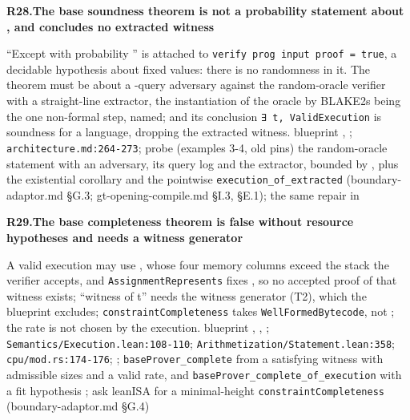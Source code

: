 \par\medskip\noindent\textbf{R28.}\enspace\textbf{The base soundness theorem is not a probability statement about , and concludes no extracted witness}\par\nopagebreak
{} ``Except with probability '' is attached to \texttt{verify prog input proof =\allowbreak{} true}, a decidable hypothesis about fixed values: there is no randomness in it. The theorem must be about a -query adversary against the random-oracle verifier with a straight-line extractor, the instantiation of the oracle by BLAKE2s being the one non-formal step, named; and its conclusion \texttt{∃ t,\allowbreak{} Valid\allowbreak{}Execution} is soundness for a language, dropping the extracted witness.
 blueprint , ; \texttt{architecture.\allowbreak{}md:\allowbreak{}264-\allowbreak{}273}; probe  (examples 3-4, old pins)
 the random-oracle statement with an adversary, its query log and the extractor, bounded by , plus the existential corollary and the pointwise \texttt{execution\_\allowbreak{}of\_\allowbreak{}extracted} (boundary-adaptor.md §G.3; gt-opening-compile.md §I.3, §E.1); the same repair in 

\par\medskip\noindent\textbf{R29.}\enspace\textbf{The base completeness theorem is false without resource hypotheses and needs a witness generator}\par\nopagebreak
{} A valid execution may use , whose four memory columns exceed the  stack the verifier accepts, and \texttt{Assignment\allowbreak{}Represents} fixes , so no accepted proof of that witness exists; ``witness of t'' needs the witness generator (T2), which the blueprint excludes; \texttt{constraint\allowbreak{}Completeness} takes \texttt{Well\allowbreak{}Formed\allowbreak{}Bytecode}, not ; the rate is not chosen by the execution.
 blueprint , , ; \texttt{Semantics/\allowbreak{}Execution.\allowbreak{}lean:\allowbreak{}108-\allowbreak{}110}; \texttt{Arithmetization/\allowbreak{}Statement.\allowbreak{}lean:\allowbreak{}358}; \texttt{cpu/\allowbreak{}mod.\allowbreak{}rs:\allowbreak{}174-\allowbreak{}176}; ; 
 \texttt{base\allowbreak{}Prover\_\allowbreak{}complete} from a satisfying witness with admissible sizes and a valid rate, and \texttt{base\allowbreak{}Prover\_\allowbreak{}complete\_\allowbreak{}of\_\allowbreak{}execution} with a fit hypothesis ; ask leanISA for a minimal-height \texttt{constraint\allowbreak{}Completeness} (boundary-adaptor.md §G.4)

